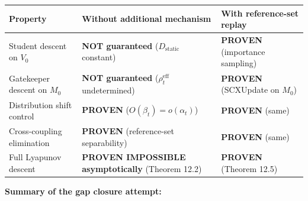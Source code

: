 \documentclass[
  12pt,
]{ctexart}
\begin{document}
\begin{longtable}[]{@{}
  >{\raggedright\arraybackslash}p{}
  >{\raggedright\arraybackslash}p{}
  >{\raggedright\arraybackslash}p{}@{}}
\toprule\noalign{}
\begin{minipage}[b]{\linewidth}\raggedright
Property
\end{minipage} & \begin{minipage}[b]{\linewidth}\raggedright
Without additional mechanism
\end{minipage} & \begin{minipage}[b]{\linewidth}\raggedright
With reference-set replay
\end{minipage} \\
\midrule\noalign{}
\endhead
\bottomrule\noalign{}
\endlastfoot
Student descent on \(V_0\) & \textbf{NOT guaranteed}
(\(D_{\text{static}}\) constant) & \textbf{PROVEN} (importance
sampling) \\
Gatekeeper descent on \(M_0\) & \textbf{NOT guaranteed}
(\(\rho_t^{\text{eff}}\) undetermined) & \textbf{PROVEN} (SCXUpdate on
\(M_0\)) \\
Distribution shift control & \textbf{PROVEN}
(\(O(\beta_t) = o(\alpha_t)\)) & \textbf{PROVEN} (same) \\
Cross-coupling elimination & \textbf{PROVEN} (reference-set
separability) & \textbf{PROVEN} (same) \\
Full Lyapunov descent & \textbf{PROVEN IMPOSSIBLE asymptotically}
(Theorem 12.2) & \textbf{PROVEN} (Theorem 12.5) \\
\end{longtable}

\textbf{Summary of the gap closure attempt:}
\end{document}
